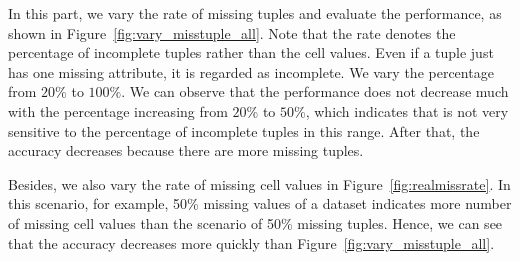

 In this part, we vary the rate of missing tuples and evaluate the performance, as shown in Figure~\ref{fig:vary_misstuple_all}. 
Note that the rate  denotes the percentage of incomplete tuples rather than the cell values. Even if a tuple just has one missing attribute, it is regarded as incomplete.	
	We vary the percentage  from $20\%$ to $100\%$. We can observe that the performance does not decrease  much with the percentage increasing from $20\%$ to $50\%$, which indicates that \ours is not very sensitive to the percentage of incomplete tuples in this range. After that, the accuracy decreases because there are more missing tuples.

Besides, we also vary the rate of missing cell values in Figure~\ref{fig:realmissrate}. In this scenario, for example, 50\% missing values of a dataset  indicates more number of missing cell values than the scenario of 50\% missing tuples. Hence, we can see that the accuracy decreases more quickly than Figure~\ref{fig:vary_misstuple_all}.



